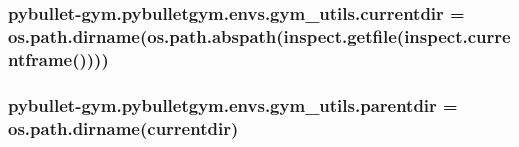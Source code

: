 \subsubsection[{\texorpdfstring{currentdir}{currentdir}}]{\setlength{\rightskip}{0pt plus 5cm}pybullet-\/gym.\+pybulletgym.\+envs.\+gym\+\_\+utils.\+currentdir = os.\+path.\+dirname(os.\+path.\+abspath(inspect.\+getfile(inspect.\+currentframe())))}\hypertarget{namespacepybullet-gym_1_1pybulletgym_1_1envs_1_1gym__utils_acbef40ccd280f1acccdbc39de15cc558}{}\label{namespacepybullet-gym_1_1pybulletgym_1_1envs_1_1gym__utils_acbef40ccd280f1acccdbc39de15cc558}
\subsubsection[{\texorpdfstring{parentdir}{parentdir}}]{\setlength{\rightskip}{0pt plus 5cm}pybullet-\/gym.\+pybulletgym.\+envs.\+gym\+\_\+utils.\+parentdir = os.\+path.\+dirname({\bf currentdir})}\hypertarget{namespacepybullet-gym_1_1pybulletgym_1_1envs_1_1gym__utils_ab157a243fec342ebf1d0a34372f53dc1}{}\label{namespacepybullet-gym_1_1pybulletgym_1_1envs_1_1gym__utils_ab157a243fec342ebf1d0a34372f53dc1}
